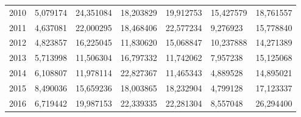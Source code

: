 \begin{table}
\begin{tabular}{p{1cm}p{2cm}p{2cm}p{2cm}p{2cm}p{2cm}p{2cm}}
 2010 &                                    5,079174 & 24,351084 &      18,203829 &                  19,912753 &                             15,427579 &                           18,761557 \\
 2011 &                                    4,637081 & 22,000295 &      18,468406 &                  22,577234 &                              9,276923 &                           15,778840 \\
 2012 &                                    4,823857 & 16,225045 &      11,830620 &                  15,068847 &                             10,237888 &                           14,271389 \\
 2013 &                                    5,713998 & 11,506304 &      16,797332 &                  11,742062 &                              7,957238 &                           15,125068 \\
 2014 &                                    6,108807 & 11,978114 &      22,827367 &                  11,465343 &                              4,889528 &                           14,895021 \\
 2015 &                                    8,490036 & 15,659236 &      18,003865 &                  18,232904 &                              4,799128 &                           17,123337 \\
 2016 &                                    6,719442 & 19,987153 &      22,339335 &                  22,281304 &                              8,557048 &                           26,294400 \\
\bottomrule
\end{tabular}
\end{table}
